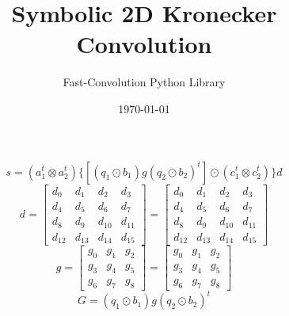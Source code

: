 \documentclass{article}%
\title{Symbolic 2D Kronecker Convolution}%
\author{Fast{-}Convolution Python Library}%
\date{\today}%
\begin{document}
%
\normalsize%
\maketitle%
\[%
s=(a_1^t \otimes a_2^t) \{[(q_1 \odot b_1) g (q_2 \odot b_2)^t] \odot (c_1^t \otimes c_2^t)\} d%
\]%
\[%
d = \left[\begin{matrix}d_{0} & d_{1} & d_{2} & d_{3}\\d_{4} & d_{5} & d_{6} & d_{7}\\d_{8} & d_{9} & d_{10} & d_{11}\\d_{12} & d_{13} & d_{14} & d_{15}\end{matrix}\right] = \left[\begin{matrix}d_{0} & d_{1} & d_{2} & d_{3}\\d_{4} & d_{5} & d_{6} & d_{7}\\d_{8} & d_{9} & d_{10} & d_{11}\\d_{12} & d_{13} & d_{14} & d_{15}\end{matrix}\right]%
\]%
\[%
g = \left[\begin{matrix}g_{0} & g_{1} & g_{2}\\g_{3} & g_{4} & g_{5}\\g_{6} & g_{7} & g_{8}\end{matrix}\right] = \left[\begin{matrix}g_{0} & g_{1} & g_{2}\\g_{3} & g_{4} & g_{5}\\g_{6} & g_{7} & g_{8}\end{matrix}\right]%
\]%
\[%
G = (q_1 \odot b_1) g (q_2 \odot b_2)^t%
\]%
\end{document}

